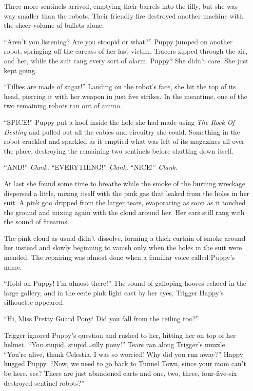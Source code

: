 Three more sentinels arrived, emptying their barrels into the filly, but she was way smaller than the robots. Their friendly fire destroyed another machine with the sheer volume of bullets alone.

``Aren't you listening? Are you stoopid or what?'' Puppy jumped on another robot, springing off the carcass of her last victim. Tracers zipped through the air, and her, while the suit rang every sort of alarm. Puppy? She didn't care. She just kept going.

``Fillies are made of sugar!'' Landing on the robot's face, she hit the top of its head, piercing it with her weapon in just five strikes. In the meantime, one of the two remaining robots ran out of ammo.

``SPICE!'' Puppy put a hoof inside the hole she had made using \emph{The Rock Of Destiny}\/ and pulled out all the cables and circuitry she could. Something in the robot crackled and sparkled as it emptied what was left of its magazines all over the place, destroying the remaining two sentinels before shutting down itself.

``AND!'' \emph{Clank.}\/ ``EVERYTHING!'' \emph{Clank.}\/ ``NICE!'' \emph{Clank.}

At last she found some time to breathe while the smoke of the burning wreckage dispersed a little, mixing itself with the pink gas that leaked from the holes in her suit. A pink goo dripped from the larger tears, evaporating as soon as it touched the ground and mixing again with the cloud around her. Her ears still rang with the sound of firearms.

The pink cloud as usual didn't dissolve, forming a thick curtain of smoke around her instead and slowly beginning to vanish only when the holes in the suit were mended. The repairing was almost done when a familiar voice called Puppy's name.

``Hold on Puppy! I'm almost there!'' The sound of galloping hooves echoed in the large gallery, and in the eerie pink light cast by her eyes, Trigger Happy's silhouette appeared.

``Hi, Miss Pretty Guard Pony! Did you fall from the ceiling too?''

Trigger ignored Puppy's question and rushed to her, hitting her on top of her helmet. ``You stupid, stupid\dots silly pony!'' Tears ran along Trigger's muzzle. ``You're alive, thank Celestia. I was so worried! Why did you run away?'' Happy hugged Puppy. ``Now, we need to go back to Tunnel Town, since your mom can't be here, see? There are just abandoned carts and one, two, three, four-five-six destroyed sentinel robots?''

